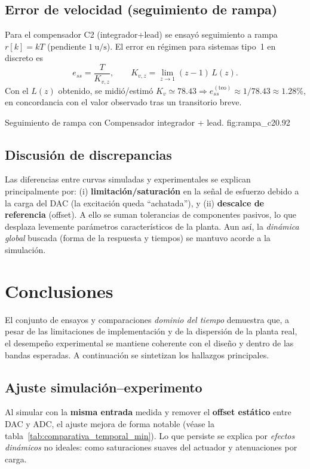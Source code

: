 \subsection{Error de velocidad (seguimiento de rampa)}
Para el compensador C2 (integrador+lead) se ensayó seguimiento a rampa \(r[k]=kT\) (pendiente \(1\ \mathrm{u}/\mathrm{s}\)). El error en régimen para sistemas tipo~1 en discreto es
\begin{equation}
	\label{eq:ess_rampa_discreto}
	e_{ss}=\frac{T}{K_{v,z}},\qquad K_{v,z}=\lim_{z\to1}(z-1)\,L(z).
\end{equation}
Con el \(L(z)\) obtenido, se midió/estimó \(K_v\simeq 78.43\Rightarrow e_{ss}^{(\mathrm{teo})}\approx 1/78.43\approx 1.28\%\), en concordancia con el valor observado tras un transitorio breve.

{Seguimiento de rampa con Compensador integrador + lead.}
{fig:rampa_c2}{0.92}

\subsection{Discusión de discrepancias}
Las diferencias entre curvas simuladas y experimentales se explican principalmente por: (i) \textbf{limitación/saturación} en la señal de esfuerzo debido a la carga del DAC (la excitación queda “achatada”), y (ii) \textbf{descalce de referencia} (offset). A ello se suman tolerancias de componentes pasivos, lo que desplaza levemente parámetros característicos de la planta. Aun así, la \emph{dinámica global} buscada (forma de la respuesta y tiempos) se mantuvo acorde a la simulación.




\section{Conclusiones}

El conjunto de ensayos y comparaciones \emph{dominio del tiempo} demuestra que, a pesar de las limitaciones de implementación y de la dispersión de la planta real, el desempeño experimental se mantiene coherente con el diseño y dentro de las bandas esperadas. A continuación se sintetizan los hallazgos principales.

\subsection*{Ajuste simulación–experimento}
Al simular con la \textbf{misma entrada} medida y remover el \textbf{offset estático} entre DAC y ADC, el ajuste mejora de forma notable (véase la tabla~\ref{tab:comparativa_temporal_min}). Lo que persiste se explica por \emph{efectos dinámicos} no ideales: como saturaciones suaves del actuador y  atenuaciones por carga.

